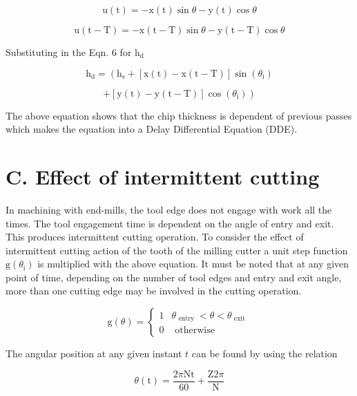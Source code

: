 \documentclass[10pt]{article}
\begin{document}
\[
\mathrm{u}\left( \mathrm{t}\right)  =  - \mathrm{x}\left( \mathrm{t}\right) \sin \theta  - \mathrm{y}\left( \mathrm{t}\right) \cos \theta  \tag{8}
\]

\[
\mathrm{u}\left( {\mathrm{t} - \mathrm{T}}\right)  =  - \mathrm{x}\left( {\mathrm{t} - \mathrm{T}}\right) \sin \theta  - \mathrm{y}\left( {\mathrm{t} - \mathrm{T}}\right) \cos \theta  \tag{9}
\]

Substituting in the Eqn. 6 for \({\mathrm{h}}_{\mathrm{d}}\)

\[
{\mathrm{h}}_{\mathrm{d}} = \left( {{\mathrm{h}}_{\mathrm{s}} + \left\lbrack  {\mathrm{x}\left( \mathrm{t}\right)  - \mathrm{x}\left( {\mathrm{t} - \mathrm{T}}\right) }\right\rbrack  \sin \left( {\theta }_{\mathrm{i}}\right) }\right.  \tag{10}
\]

\[
\left. {+\left\lbrack  {\mathrm{y}\left( \mathrm{t}\right)  - \mathrm{y}\left( {\mathrm{t} - \mathrm{T}}\right) }\right\rbrack  \cos \left( {\theta }_{\mathrm{i}}\right) }\right)
\]

The above equation shows that the chip thickness is dependent of previous passes which makes the equation into a Delay Differential Equation (DDE).

\section*{C. Effect of intermittent cutting}

In machining with end-mills, the tool edge does not engage with work all the times. The tool engagement time is dependent on the angle of entry and exit. This produces intermittent cutting operation. To consider the effect of intermittent cutting action of the tooth of the milling cutter a unit step function \(\mathrm{g}\left( {\theta }_{\mathrm{i}}\right)\) is multiplied with the above equation. It must be noted that at any given point of time, depending on the number of tool edges and entry and exit angle, more than one cutting edge may be involved in the cutting operation.

\[
\mathrm{g}\left( \theta \right)  = \left\{  \begin{matrix} 1 & {\theta }_{\text{ entry }} < \theta  < {\theta }_{\text{ exit }} \\  0 & \text{ otherwise } \end{matrix}\right.  \tag{11}
\]

The angular position at any given instant \(t\) can be found by using the relation

\[
\theta \left( \mathrm{t}\right)  = \frac{{2\pi }\mathrm{{Nt}}}{60} + \frac{\mathrm{Z}{2\pi }}{\mathrm{N}} \tag{12}
\]
\end{document}
